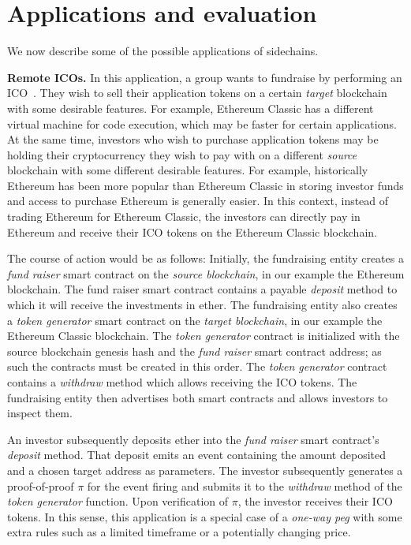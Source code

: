 \section{Applications and evaluation}

We now describe some of the possible applications of sidechains.

\noindent
\textbf{Remote ICOs. } In this application, a group wants to fundraise by
performing an ICO~\cite{ico}. They wish to sell their application tokens on a
certain \emph{target} blockchain with some desirable features. For example,
Ethereum Classic has a different virtual machine for code execution, which may
be faster for certain applications. At the same time, investors who wish to
purchase application tokens may be holding their cryptocurrency they wish to pay
with on a different \emph{source} blockchain with some different desirable
features. For example, historically Ethereum has been more popular than Ethereum
Classic in storing investor funds and access to purchase Ethereum is generally
easier. In this context, instead of trading Ethereum for Ethereum Classic, the
investors can directly pay in Ethereum and receive their ICO tokens on the
Ethereum Classic blockchain.

The course of action would be as follows: Initially, the fundraising entity
creates a \emph{fund raiser} smart contract on the \emph{source blockchain}, in
our example the Ethereum blockchain. The fund raiser smart contract contains a
payable \emph{deposit} method to which it will receive the investments in
ether. The fundraising entity also creates a \emph{token generator} smart
contract on the \emph{target blockchain}, in our example the Ethereum Classic
blockchain. The \emph{token generator} contract is initialized with the source
blockchain genesis hash and the \emph{fund raiser} smart contract address; as
such the contracts must be created in this order. The \emph{token generator}
contract contains a \emph{withdraw} method which allows receiving the ICO
tokens. The fundraising entity then advertises both smart contracts and allows
investors to inspect them.

An investor subsequently deposits ether into the \emph{fund raiser} smart
contract's \emph{deposit} method. That deposit emits an event containing the
amount deposited and a chosen target address as parameters. The investor
subsequently generates a proof-of-proof $\pi$ for the event firing and submits
it to the \emph{withdraw} method of the \emph{token generator} function. Upon
verification of $\pi$, the investor receives their ICO tokens. In this sense,
this application is a special case of a \emph{one-way peg} with some extra
rules such as a limited timeframe or a potentially changing price.

